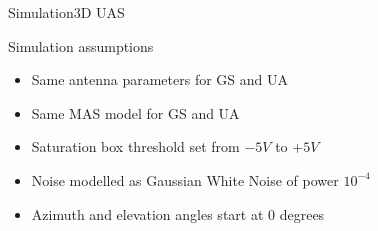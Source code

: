 
\begin{frame}{Simulation}{3D UAS}
  \begin{block}{Simulation assumptions}
	  \begin{itemize}
	  	\item Same antenna parameters for GS and UA
	  	\item Same MAS model for GS and UA
	  	\item Saturation box threshold set from $-5V$ to $+5V$
	  	\item Noise modelled as Gaussian White Noise of power $10^{-4}$
	  	\item Azimuth and elevation angles start at 0 degrees
	  \end{itemize}
  \end{block}
\end{frame}